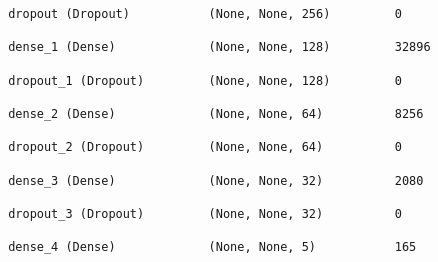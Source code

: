 \documentclass[
  letterpaper,
  DIV=11,
  numbers=noendperiod]{scrreprt}
\begin{document}
\begin{verbatim}
 dropout (Dropout)           (None, None, 256)         0         
                                                                 
 dense_1 (Dense)             (None, None, 128)         32896     
                                                                 
 dropout_1 (Dropout)         (None, None, 128)         0         
                                                                 
 dense_2 (Dense)             (None, None, 64)          8256      
                                                                 
 dropout_2 (Dropout)         (None, None, 64)          0         
                                                                 
 dense_3 (Dense)             (None, None, 32)          2080      
                                                                 
 dropout_3 (Dropout)         (None, None, 32)          0         
                                                                 
 dense_4 (Dense)             (None, None, 5)           165       
                                                                 

\end{verbatim}
\end{document}
